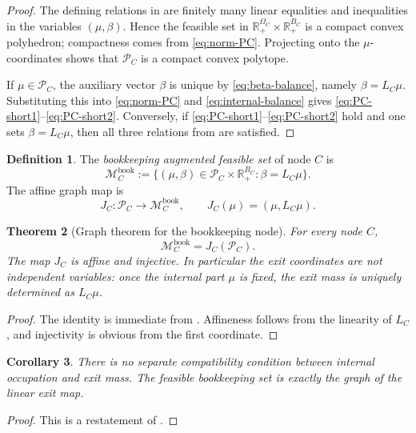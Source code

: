 \documentclass[12pt]{article}
\newtheorem{theorem}{Theorem}[section]
\newtheorem{corollary}[theorem]{Corollary}
\theoremstyle{definition}
\newtheorem{definition}[theorem]{Definition}
\newcommand{\R}{\mathbb{R}}
\newcommand{\1}{\mathbf{1}}
\newcommand{\cM}{\mathcal{M}}
\newcommand{\cP}{\mathcal{P}}
\begin{document}
\begin{proof}
The defining relations in  are finitely many linear equalities and
inequalities in the variables $(\mu,\beta)$. Hence the feasible set in
$\R_+^{\Omega_C}\times\R_+^{B_C}$ is a compact convex polyhedron; compactness
comes from \eqref{eq:norm-PC}. Projecting onto the $\mu$-coordinates shows that
$\cP_C$ is a compact convex polytope.

If $\mu\in\cP_C$, the auxiliary vector $\beta$ is unique by
\eqref{eq:beta-balance}, namely $\beta=L_C\mu$. Substituting this into
\eqref{eq:norm-PC} and \eqref{eq:internal-balance} gives
\eqref{eq:PC-short1}--\eqref{eq:PC-short2}. Conversely, if
\eqref{eq:PC-short1}--\eqref{eq:PC-short2} hold and one sets $\beta=L_C\mu$, then
all three relations from  are satisfied.
\end{proof}

\begin{definition}
\label{def:MCbook}
The \emph{bookkeeping augmented feasible set} of node $C$ is
\[
\cM_C^{\mathrm{book}}
:=
\{(\mu,\beta)\in\cP_C\times\R_+^{B_C}:\beta=L_C\mu\}.
\]
The affine graph map is
\[
J_C:\cP_C\to \cM_C^{\mathrm{book}},
\qquad J_C(\mu)=(\mu,L_C\mu).
\]
\end{definition}

\begin{theorem}[Graph theorem for the bookkeeping node]
\label{thm:graph-theorem}
For every node $C$,
\[
\cM_C^{\mathrm{book}} = J_C(\cP_C).
\]
The map $J_C$ is affine and injective. In particular the exit coordinates are not
independent variables: once the internal part $\mu$ is fixed, the exit mass is
uniquely determined as $L_C\mu$.
\end{theorem}

\begin{proof}
The identity is immediate from . Affineness follows from the
linearity of $L_C$, and injectivity is obvious from the first coordinate.
\end{proof}

\begin{corollary}
\label{cor:no-vp3}
There is no separate compatibility condition between internal occupation and exit
mass. The feasible bookkeeping set is exactly the graph of the linear exit map.
\end{corollary}

\begin{proof}
This is a restatement of .
\end{proof}
\end{document}
